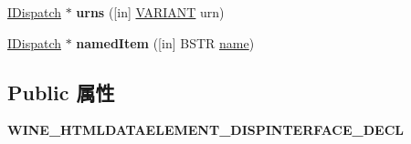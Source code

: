\begin{DoxyCompactItemize}
\mbox{\label{interface_m_s_h_t_m_l_1_1_disp_h_t_m_l_select_element_a6953bde26e6b6a24a43c0b4b3213728b}} 
\hyperlink{interface_i_dispatch}{I\+Dispatch} $\ast$ {\bfseries urns} (\mbox{[}in\mbox{]} \hyperlink{structtag_v_a_r_i_a_n_t}{V\+A\+R\+I\+A\+NT} urn)
\item 
\mbox{\label{interface_m_s_h_t_m_l_1_1_disp_h_t_m_l_select_element_a8f2e45d7a6ba59c4648c7a41577b4fe6}} 
\hyperlink{interface_i_dispatch}{I\+Dispatch} $\ast$ {\bfseries named\+Item} (\mbox{[}in\mbox{]} B\+S\+TR \hyperlink{structname}{name})
\end{DoxyCompactItemize}
\subsection*{Public 属性}
\begin{DoxyCompactItemize}
\item 
\mbox{\label{interface_m_s_h_t_m_l_1_1_disp_h_t_m_l_select_element_a6b96f93a899af462e2f37a9166319be6}} 
{\bfseries W\+I\+N\+E\+\_\+\+H\+T\+M\+L\+D\+A\+T\+A\+E\+L\+E\+M\+E\+N\+T\+\_\+\+D\+I\+S\+P\+I\+N\+T\+E\+R\+F\+A\+C\+E\+\_\+\+D\+E\+CL}
\end{DoxyCompactItemize}
